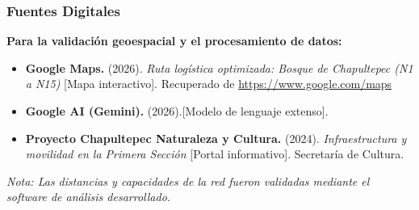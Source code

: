 \documentclass[aspectratio=169]{beamer}
\begin{document}
\begin{frame}
    \frametitle{Fuentes Digitales}
    \textbf{Para la validación geoespacial y el procesamiento de datos:}
    \vspace{0.4cm}
    
    \begin{itemize}
        \item \textbf{Google Maps.} (2026). \textit{Ruta logística optimizada: Bosque de Chapultepec (N1 a N15)} [Mapa interactivo]. Recuperado de \url{https://www.google.com/maps}
        \vspace{0.3cm}
        \item \textbf{Google AI (Gemini).} (2026).[Modelo de lenguaje extenso].
        \vspace{0.3cm}
        \item \textbf{Proyecto Chapultepec Naturaleza y Cultura.} (2024). \textit{Infraestructura y movilidad en la Primera Sección} [Portal informativo]. Secretaría de Cultura.
    \end{itemize}
    
    \vspace{0.4cm}
    \textit{Nota: Las distancias y capacidades de la red fueron validadas mediante el software de análisis desarrollado.}
\end{frame}
\end{document}
